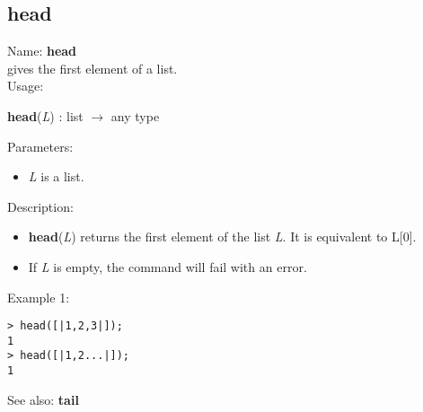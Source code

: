\subsection{ head }
\noindent Name: \textbf{head}\\
gives the first element of a list.\\

\noindent Usage: 
\begin{center}
\textbf{head}(\emph{L}) : \textsf{list} $\rightarrow$ \textsf{any type}\\
\end{center}
Parameters: 
\begin{itemize}
\item \emph{L} is a list.
\end{itemize}
\noindent Description: \begin{itemize}

\item \textbf{head}(\emph{L}) returns the first element of the list \emph{L}. It is equivalent
   to L[0].

\item If \emph{L} is empty, the command will fail with an error.
\end{itemize}
\noindent Example 1: 
\begin{center}\begin{minipage}{15cm}\begin{Verbatim}[frame=single]
> head([|1,2,3|]);
1
> head([|1,2...|]);
1
\end{Verbatim}
\end{minipage}\end{center}
See also: \textbf{tail}
